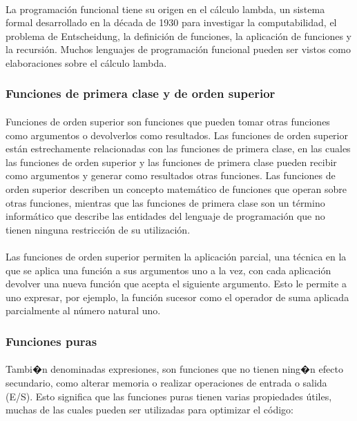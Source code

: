 \documentclass{standalone}
\begin{document}
\paragraph{}
La programación funcional tiene su origen en el cálculo lambda, un sistema formal desarrollado en la década de 1930 para investigar la computabilidad, el problema de Entscheidung, la definición de funciones, la aplicación de funciones y la recursión. Muchos lenguajes de programación funcional pueden ser vistos como elaboraciones sobre el cálculo lambda.

\subsubsection{Funciones de primera clase y de orden superior}
\paragraph{}
Funciones de orden superior son funciones que pueden tomar otras funciones como argumentos o devolverlos como resultados. Las funciones de orden superior están estrechamente relacionadas con las funciones de primera clase, en las cuales las funciones de orden superior y las funciones de primera clase pueden recibir como argumentos y generar como resultados otras funciones. Las funciones de orden superior describen un concepto matemático de funciones que operan sobre otras funciones, mientras que las funciones de primera clase son un término informático que describe las entidades del lenguaje de programación que no tienen ninguna restricción de su utilización.

\paragraph{}
Las funciones de orden superior permiten la aplicación parcial, una técnica en la que se aplica una función a sus argumentos uno a la vez, con cada aplicación devolver una nueva función que acepta el siguiente argumento. Esto le permite a uno expresar, por ejemplo, la función sucesor como el operador de suma aplicada parcialmente al número natural uno.

\subsubsection{Funciones puras}
\paragraph{}
Tambi�n denominadas expresiones, son funciones que no tienen ning�n efecto secundario, como alterar memoria o realizar operaciones de entrada o salida (E/S). Esto significa que las funciones puras tienen varias propiedades útiles, muchas de las cuales pueden ser utilizadas para optimizar el código:
\end{document}
